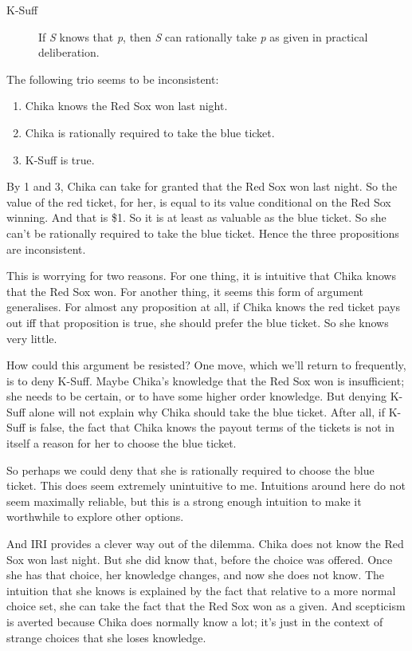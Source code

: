 \begin{description}

\item[K-Suff]

If \emph{S} knows that \emph{p}, then \emph{S} can rationally take \emph{p} as given in practical deliberation.
\end{description}
The following trio seems to be inconsistent:

\begin{enumerate}
\item Chika knows the Red Sox won last night.

\item Chika is rationally required to take the blue ticket.

\item K-Suff is true.

\end{enumerate}
By 1 and 3, Chika can take for granted that the Red Sox won last night. So the value of the red ticket, for her, is equal to its value conditional on the Red Sox winning. And that is \$1. So it is at least as valuable as the blue ticket. So she can't be rationally required to take the blue ticket. Hence the three propositions are inconsistent.

This is worrying for two reasons. For one thing, it is intuitive that Chika knows that the Red Sox won. For another thing, it seems this form of argument generalises. For almost any proposition at all, if Chika knows the red ticket pays out iff that proposition is true, she should prefer the blue ticket. So she knows very little.

How could this argument be resisted? One move, which we'll return to frequently, is to deny K-Suff. Maybe Chika's knowledge that the Red Sox won is insufficient; she needs to be certain, or to have some higher order knowledge. But denying K-Suff alone will not explain why Chika should take the blue ticket. After all, if K-Suff is false, the fact that Chika knows the payout terms of the tickets is not in itself a reason for her to choose the blue ticket. 

So perhaps we could deny that she is rationally required to choose the blue ticket. This does seem extremely unintuitive to me. Intuitions around here do not seem maximally reliable, but this is a strong enough intuition to make it worthwhile to explore other options.

And IRI provides a clever way out of the dilemma. Chika does not know the Red Sox won last night. But she did know that, before the choice was offered. Once she has that choice, her knowledge changes, and now she does not know. The intuition that she knows is explained by the fact that relative to a more normal choice set, she can take the fact that the Red Sox won as a given. And scepticism is averted because Chika does normally know a lot; it's just in the context of strange choices that she loses knowledge.

